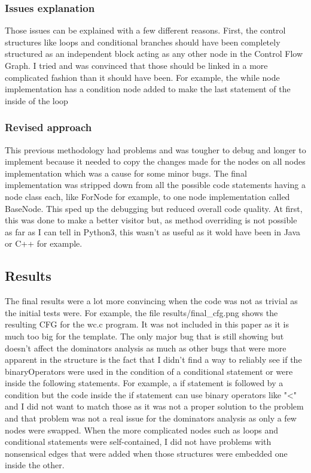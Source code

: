 \documentclass[conference,compsoc]{IEEEtran}
\begin{document}
\subsubsection{Issues explanation}
 Those issues can be explained with a few different reasons. First, the control
 structures like loops and conditional branches should have been completely structured
 as an independent block acting as any other node in the Control Flow Graph. I tried and
 was convinced that those should be linked in a more complicated fashion than it should have been.
 For example, the while node implementation has a condition node added to make the last statement of the inside
 of the loop 

\subsubsection{Revised approach}
 This previous methodology had problems and was tougher to debug and longer to implement because it
 needed to copy the changes made for the nodes on all nodes implementation which was a cause for some
 minor bugs. The final implementation was stripped down from all the possible code statements having
 a node class each, like ForNode for example, to one node implementation called BaseNode. This sped up
 the debugging but reduced overall code quality. At first, this was done to make a better visitor but,
 as method overriding is not possible as far as I can tell in Python3, this wasn't as useful as it
 wold have been in Java or C++ for example.

\subsection{Results}

The final results were a lot more convincing when the code was not as trivial as the initial tests were.
For example, the file results/final\_cfg.png shows the resulting CFG for the wc.c program. It was not included
 in this paper as it is much too big for the template. The only major bug that is still showing
 but doesn't affect the dominators analysis as much as other bugs that were more apparent in the structure is the fact
 that I didn't find a way to reliably see if the binaryOperators were used in the condition of a conditional statement
 or were inside the following statements. For example, a if statement is followed by a condition but the code inside the
 if statement can use binary operators like "<" and I did not want to match those as it was not a proper solution to the problem
 and that problem was not a real issue for the dominators analysis as only a few nodes were swapped. When the more complicated nodes
 such as loops and conditional statements were self-contained, I did not have problems with nonsensical edges that were added when
 those structures were embedded one inside the other.
\end{document}
